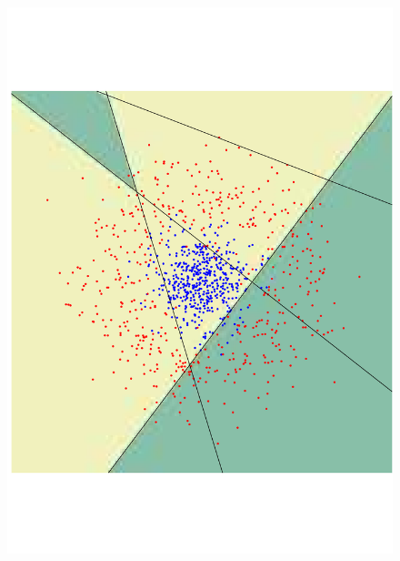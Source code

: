 \begin{figure}
\begin{center}
 \includegraphics[angle=270, scale=0.166]{ch4/figures/83.pdf}\\

\end{center}
\end{figure}

